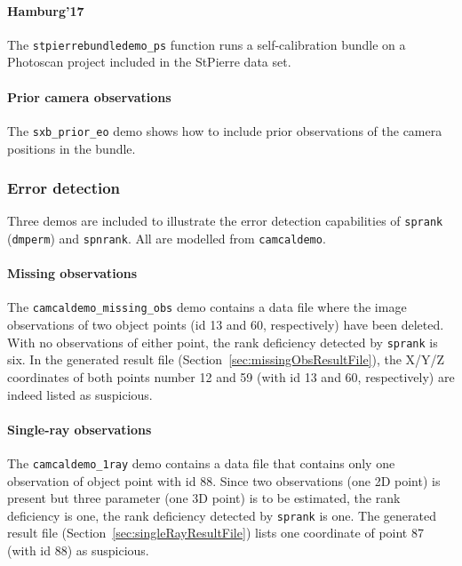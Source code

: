 \documentclass{article}
\begin{document}
\paragraph{\sc Hamburg'17}
The \texttt{stpierrebundledemo\_ps} function runs a self-calibration
bundle on a Photoscan project included in the StPierre data set.

\paragraph{\sc Prior camera observations}
The \texttt{sxb\_prior\_eo} demo shows how to include prior
observations of the camera positions in the bundle.

\subsubsection{Error detection}

Three demos are included to illustrate the error detection
capabilities of \texttt{sprank} (\texttt{dmperm}) and
\texttt{spnrank}. All are modelled from \texttt{camcaldemo}.

\paragraph{Missing observations}

The \texttt{camcaldemo\_missing\_obs} demo contains a data file where
the image observations of two object points (id 13 and 60,
respectively) have been deleted. With no observations of either point,
the rank deficiency detected by \texttt{sprank} is six. In the
generated result file (Section~\ref{sec:missingObsResultFile}), the
X/Y/Z coordinates of both points number 12 and 59 (with id 13 and 60,
respectively) are indeed listed as suspicious.

\paragraph{Single-ray observations}

The \texttt{camcaldemo\_1ray} demo contains a data file that contains
only one observation of object point with id 88. Since two
observations (one 2D point) is present but three parameter (one 3D
point) is to be estimated, the rank deficiency is one, the rank
deficiency detected by \texttt{sprank} is one. The generated result
file (Section~\ref{sec:singleRayResultFile}) lists one coordinate of
point 87 (with id 88) as suspicious.
\end{document}
